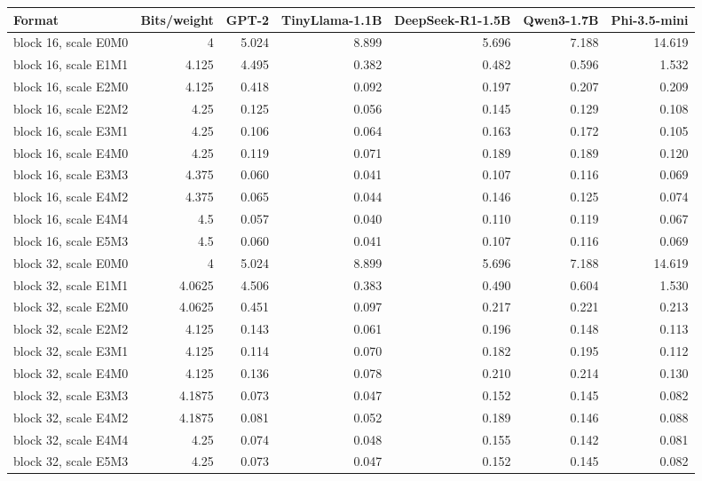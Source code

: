 \begin{tabular}{lrrrrrr}
\toprule
Format & Bits/weight & GPT-2 & TinyLlama-1.1B & DeepSeek-R1-1.5B & Qwen3-1.7B & Phi-3.5-mini \\
\midrule
block 16, scale E0M0 & 4 & 5.024 & 8.899 & 5.696 & 7.188 & 14.619 \\
block 16, scale E1M1 & 4.125 & 4.495 & 0.382 & 0.482 & 0.596 & 1.532 \\
block 16, scale E2M0 & 4.125 & 0.418 & 0.092 & 0.197 & 0.207 & 0.209 \\
block 16, scale E2M2 & 4.25 & 0.125 & 0.056 & 0.145 & 0.129 & 0.108 \\
block 16, scale E3M1 & 4.25 & 0.106 & 0.064 & 0.163 & 0.172 & 0.105 \\
block 16, scale E4M0 & 4.25 & 0.119 & 0.071 & 0.189 & 0.189 & 0.120 \\
block 16, scale E3M3 & 4.375 & 0.060 & 0.041 & 0.107 & 0.116 & 0.069 \\
block 16, scale E4M2 & 4.375 & 0.065 & 0.044 & 0.146 & 0.125 & 0.074 \\
block 16, scale E4M4 & 4.5 & 0.057 & 0.040 & 0.110 & 0.119 & 0.067 \\
block 16, scale E5M3 & 4.5 & 0.060 & 0.041 & 0.107 & 0.116 & 0.069 \\
block 32, scale E0M0 & 4 & 5.024 & 8.899 & 5.696 & 7.188 & 14.619 \\
block 32, scale E1M1 & 4.0625 & 4.506 & 0.383 & 0.490 & 0.604 & 1.530 \\
block 32, scale E2M0 & 4.0625 & 0.451 & 0.097 & 0.217 & 0.221 & 0.213 \\
block 32, scale E2M2 & 4.125 & 0.143 & 0.061 & 0.196 & 0.148 & 0.113 \\
block 32, scale E3M1 & 4.125 & 0.114 & 0.070 & 0.182 & 0.195 & 0.112 \\
block 32, scale E4M0 & 4.125 & 0.136 & 0.078 & 0.210 & 0.214 & 0.130 \\
block 32, scale E3M3 & 4.1875 & 0.073 & 0.047 & 0.152 & 0.145 & 0.082 \\
block 32, scale E4M2 & 4.1875 & 0.081 & 0.052 & 0.189 & 0.146 & 0.088 \\
block 32, scale E4M4 & 4.25 & 0.074 & 0.048 & 0.155 & 0.142 & 0.081 \\
block 32, scale E5M3 & 4.25 & 0.073 & 0.047 & 0.152 & 0.145 & 0.082 \\
\bottomrule
\end{tabular}
